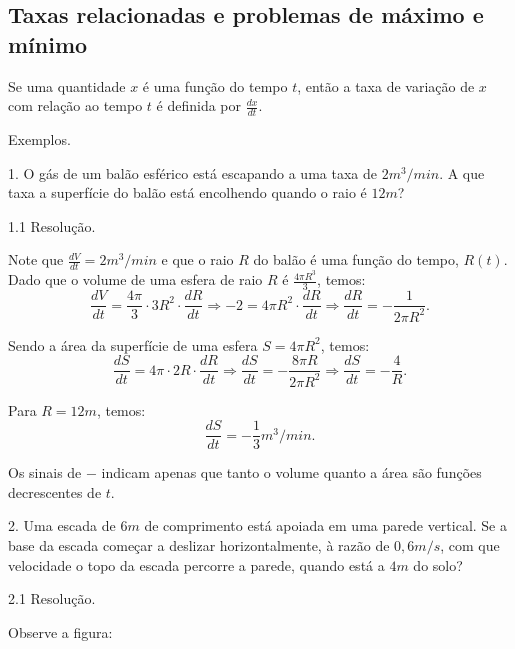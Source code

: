 \documentclass{article}
\begin{document}
{\begin{newpage}
\subsection{Taxas relacionadas e problemas de máximo e mínimo}
\hspace{12pt} Se uma quantidade $x$ é uma função do tempo $t$, então a taxa de variação de $x$ com relação ao tempo $t$ é definida por $\displaystyle{\frac{dx}{dt}}$.
\par
\vspace{0.3cm}
Exemplos.
\par
\begin{flushleft}
1. O gás de um balão esférico está escapando a uma taxa de $2m^{3}/min$. A que taxa a superfície do balão está encolhendo quando o raio é $12m$? 
\end{flushleft}
\vspace{0.3cm}
\begin{flushleft}
1.1 Resolução.
\end{flushleft}
\par Note que $\displaystyle{\frac{dV}{dt} = 2m^{3}/min}$ e que o raio $R$ do balão é uma função do tempo, $R(t)$. Dado que o volume de uma esfera de raio $R$ é $\displaystyle{\frac{4\pi R^3}{3}}$, temos:
\begin{equation*} \displaystyle{\frac{dV}{dt} = \frac{4\pi }{3}\cdot 3R^{2}\cdot\frac{dR}{dt} \Rightarrow -2 = 4\pi R^{2}\cdot\frac{dR}{dt} \Rightarrow \frac{dR}{dt} = -\frac{1}{2\pi R^2}}. \end{equation*}
\par Sendo a área da superfície de uma esfera $S=4\pi R^{2}$, temos:
\begin{equation*} \displaystyle{\frac{dS}{dt} = 4\pi\cdot 2R\cdot\frac{dR}{dt} \Rightarrow \frac{dS}{dt} = -\frac{8\pi R}{2\pi R^2} \Rightarrow \frac{dS}{dt} = -\frac{4}{R}}. \end{equation*}
\par Para $R=12m$, temos:
$$\displaystyle{\frac{dS}{dt} = -\frac{1}{3}m^{3}/min}.$$
\par Os sinais de $-$ indicam apenas que tanto o volume quanto a área são funções decrescentes de $t$.
\par
\vspace{0.3cm}
\begin{flushleft}
2. Uma escada de $6m$ de comprimento está apoiada em uma parede vertical. Se a base da escada começar a deslizar horizontalmente, à razão de $0,6m/s$, com que velocidade o topo da escada percorre a parede, quando está a $4m$ do solo?
\end{flushleft}
\vspace{0.3cm}
\begin{flushleft}
2.1 Resolução.
\end{flushleft} 
\par Observe a figura:


\end{newpage}}
\end{document}
